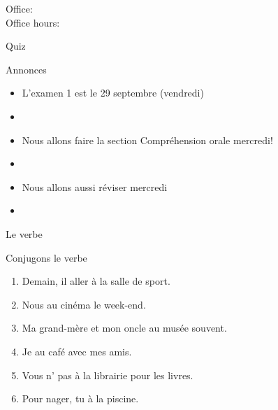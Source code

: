 \documentclass{beamer}
\subtitle[\lexi{Aller} et expressions temporelles]{Le verbe \lexi{aller} et les expressions temporelles}
\begin{document}
  \begin{frame}
    \titlepage
    \tiny{Office: \\
          Office hours: }
  \end{frame}

  \begin{frame}{}
    \begin{center}
      \Large Quiz
    \end{center}
  \end{frame}

  \begin{frame}{Annonces}
    \begin{itemize}
      \item L'examen 1 est le 29 septembre (vendredi)
      \item[] 
      \item Nous allons faire la section Compréhension orale \alert{mercredi}!
      \item[] 
      \item Nous allons aussi réviser mercredi
      \item[] 
    \end{itemize}
  \end{frame}

  \begin{frame}{Le verbe  }
    \begin{center}
      
    \end{center}
  \end{frame}

  \begin{frame}{Conjugons le verbe }
    \begin{enumerate}
      \item Demain, il \underline{} aller à la salle de sport.
      \item Nous \underline{} au cinéma le week-end.
      \item Ma grand-mère et mon oncle \underline{} au musée souvent.
      \item Je \underline{} au café avec mes amis.
      \item Vous n'\underline{} pas à la librairie pour les livres.
      \item Pour nager, tu \underline{} à la piscine.
    \end{enumerate}
  \end{frame}
\end{document}

